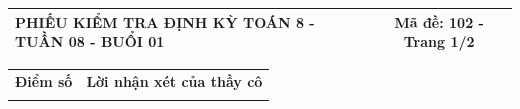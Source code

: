 \documentclass[12pt,a4paper]{article}
\begin{document}
\newpage
\noindent
\begin{tabularx}{\linewidth}{|X|c|}
\hline
\textbf{PHIẾU KIỂM TRA ĐỊNH KỲ TOÁN 8 - TUẦN 08 - BUỔI 01} & \textbf{Mã đề: 102 - Trang 1/2} \\
\hline
\end{tabularx}

\vspace{1.2mm}

\noindent
\begin{tabularx}{\linewidth}{|p{3.2cm}|X|}
\hline
\centering\textbf{Điểm số} & \centering\textbf{Lời nhận xét của thầy cô} \tabularnewline
\rule{0pt}{1.8cm} & \\
\hline
\end{tabularx}

\vspace{1.2mm}
\end{document}

